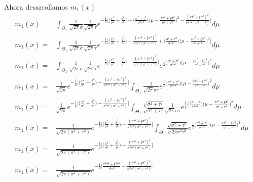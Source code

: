\documentclass[12pt,]{article}
\begin{document}
Ahora desarrollamos \(m_1(x)\) \[
\begin{array}{rl}
m_1(x)=& \displaystyle\int_{\Theta_1} \frac{1}{\sqrt{2\pi}\sigma}\frac{1}{\sqrt{2\pi}\tau} e^{-\frac{1}{2}\bigg[\bigg(\frac{x^2}{\sigma^2}+\frac{\xi^2}{\tau^2} \bigg)+\bigg(\frac{\sigma^2+\tau^2}{\sigma^2\tau^2} \bigg)\bigg(\mu -  \frac{x\tau^2+\xi\sigma^2}{\sigma^2+\tau^2} \bigg)^2-
\frac{(x\tau^2+\xi\sigma^2)^2}{\sigma^2\tau^2(\sigma^2+\tau^2)}  \bigg]}d\mu\\
m_1(x)=& \displaystyle\int_{\Theta_1} \frac{1}{\sqrt{2\pi}\sigma}\frac{1}{\sqrt{2\pi}\tau} e^{-\frac{1}{2}\bigg[\bigg(\frac{x^2}{\sigma^2}+\frac{\xi^2}{\tau^2} \bigg)-
\frac{(x\tau^2+\xi\sigma^2)^2}{\sigma^2\tau^2(\sigma^2+\tau^2)}+\bigg(\frac{\sigma^2+\tau^2}{\sigma^2\tau^2} \bigg)\bigg(\mu -  \frac{x\tau^2+\xi\sigma^2}{\sigma^2+\tau^2} \bigg)^2\bigg]}d\mu\\
m_1(x)=& \displaystyle\int_{\Theta_1} \frac{1}{\sqrt{2\pi}\sigma}\frac{1}{\sqrt{2\pi}\tau} e^{-\frac{1}{2}\bigg[\bigg(\frac{x^2}{\sigma^2}+\frac{\xi^2}{\tau^2} \bigg)-
\frac{(x\tau^2+\xi\sigma^2)^2}{\sigma^2\tau^2(\sigma^2+\tau^2)}\bigg]}e^{\frac{1}{2}\bigg(\frac{\sigma^2+\tau^2}{\sigma^2\tau^2} \bigg)\bigg(\mu -  \frac{x\tau^2+\xi\sigma^2}{\sigma^2+\tau^2} \bigg)^2}d\mu\\
m_1(x)=& \displaystyle \frac{1}{\sqrt{2\pi}} e^{-\frac{1}{2}\bigg[\bigg(\frac{x^2}{\sigma^2}+\frac{\xi^2}{\tau^2} \bigg)-
\frac{(x\tau^2+\xi\sigma^2)^2}{\sigma^2\tau^2(\sigma^2+\tau^2)}\bigg]} \int_{\Theta_1}\frac{1}{\sqrt{2\pi}\sigma\tau} e^{\frac{1}{2}\bigg(\frac{\sigma^2+\tau^2}{\sigma^2\tau^2} \bigg)\bigg(\mu -\frac{x\tau^2+\xi\sigma^2}{\sigma^2+\tau^2} \bigg)^2}d\mu\\
m_1(x)=& \displaystyle \frac{1}{\sqrt{2\pi}} e^{-\frac{1}{2}\bigg[\bigg(\frac{x^2}{\sigma^2}+\frac{\xi^2}{\tau^2} \bigg)-
\frac{(x\tau^2+\xi\sigma^2)^2}{\sigma^2\tau^2(\sigma^2+\tau^2)}\bigg]} \int_{\Theta_1}\frac{\sqrt{\sigma^2+\tau^2}}{\sqrt{\sigma^2+\tau^2}}\frac{1}{\sqrt{2\pi}\sigma\tau} e^{\frac{1}{2}\bigg(\frac{\sigma^2+\tau^2}{\sigma^2\tau^2} \bigg)\bigg(\mu -\frac{x\tau^2+\xi\sigma^2}{\sigma^2+\tau^2} \bigg)^2}d\mu\\
m_1(x)=& \displaystyle \frac{1}{\sqrt{2\pi(\sigma^2+\tau^2)}} e^{-\frac{1}{2}\bigg[\bigg(\frac{x^2}{\sigma^2}+\frac{\xi^2}{\tau^2} \bigg)-
\frac{(x\tau^2+\xi\sigma^2)^2}{\sigma^2\tau^2(\sigma^2+\tau^2)}\bigg]} \int_{\Theta_1}\frac{\sqrt{\sigma^2+\tau^2}}{\sqrt{2\pi\sigma^2\tau^2}} e^{\frac{1}{2}\bigg(\frac{\sigma^2+\tau^2}{\sigma^2\tau^2} \bigg)\bigg(\mu -\frac{x\tau^2+\xi\sigma^2}{\sigma^2+\tau^2} \bigg)^2}d\mu\\
m_1(x)=& \frac{1}{\sqrt{2\pi(\sigma^2+\tau^2)}} e^{-\frac{1}{2}\bigg[\bigg(\frac{x^2}{\sigma^2}+\frac{\xi^2}{\tau^2} \bigg)-
\frac{(x\tau^2+\xi\sigma^2)^2}{\sigma^2\tau^2(\sigma^2+\tau^2)}\bigg]}\\
m_1(x)=& \frac{1}{\sqrt{2\pi(\sigma^2+\tau^2)}} e^{-\frac{1}{2}\bigg[\frac{x^2\tau^2+\xi^2\sigma^2}{\tau^2\sigma^2}-
\frac{(x\tau^2+\xi\sigma^2)^2}{\sigma^2\tau^2(\sigma^2+\tau^2)}\bigg]}
\end{array}
\]
\end{document}
